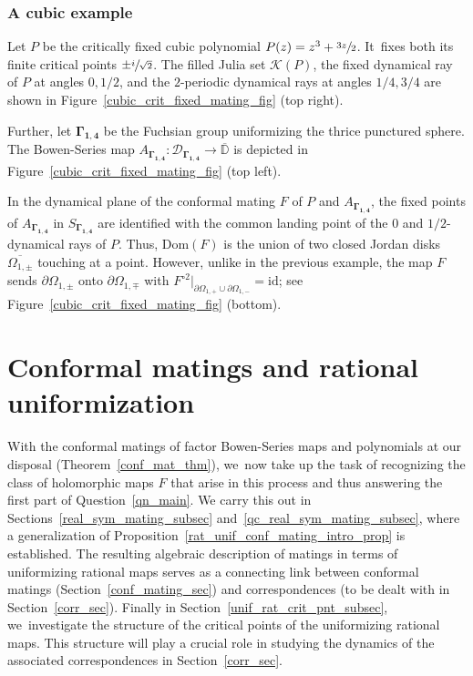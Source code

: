 \documentclass[JEP,XML,SOM,Unicode,NoFloatCountersInSection,published]{cedram}
\theoremstyle{definition}
\theoremstyle{remark}
\newcommand{\D}{\mathbb{D}}
\newcommand{\cK}{\mathcal{K}}
\begin{document}
\subsubsection{A cubic example}\label{cubic_example_subsubsec}

Let $P$ be the critically fixed cubic polynomial $P(z)=z^3+\sfrac{3z}{2}$. It~fixes both its finite critical points $\pm \sfrac{i}{\sqrt{2}}$. The filled Julia set $\cK(P)$, the fixed dynamical ray of $P$ at angles $0, 1/2$, and the $2$-periodic dynamical rays at angles $1/4, 3/4$ are shown in Figure~\ref{cubic_crit_fixed_mating_fig} (top right).

Further, let $\pmb{\Gamma_{1,4}}$ be the Fuchsian group uniformizing the thrice punctured sphere. The Bowen-Series map $A_{\pmb{\Gamma_{1,4}}}:\mathcal{D}_{\pmb{\Gamma_{1,4}}}\to\overline{\D}$ is depicted in Figure~\ref{cubic_crit_fixed_mating_fig} (top left).

In the dynamical plane of the conformal mating $F$ of $P$ and $A_{\pmb{\Gamma_{1,4}}}$, the fixed points of $A_{\pmb{\Gamma_{1,4}}}$ in $S_{\pmb{\Gamma_{1,4}}}$ are identified with the common landing point of the $0$ and $1/2$\nobreakdash-dynamical rays of $P$. Thus, $\mathrm{Dom}(F)$ is the union of two closed Jordan disks $\overline{\Omega_{1,\pm}}$ touching at a point. However, unlike in the previous example, the map $F$ sends $\partial\Omega_{1,\pm}$ onto $\partial\Omega_{1,\mp}$ with $F^{\circ 2}\vert_{\partial\Omega_{1,+}\cup\partial\Omega_{1,-}}=\mathrm{id}$; see Figure~\ref{cubic_crit_fixed_mating_fig} (bottom).

\section{Conformal matings and rational uniformization}\label{conf_mating_char_sec}

With the conformal matings of factor Bowen-Series maps and polynomials at our disposal (Theorem~\ref{conf_mat_thm}), we~now take up the task of recognizing the class of holomorphic maps
$F$ that arise in this process and thus answering the first part of Question~\ref{qn_main}.
We carry this out in Sections~\ref{real_sym_mating_subsec} and~\ref{qc_real_sym_mating_subsec}, where a generalization of Proposition~\ref{rat_unif_conf_mating_intro_prop} is established. The resulting algebraic description of matings in terms of uniformizing rational maps serves as a connecting link between conformal matings (Section~\ref{conf_mating_sec})
and correspondences (to be dealt with in Section~\ref{corr_sec}).
Finally in Section~\ref{unif_rat_crit_pnt_subsec}, we~investigate the structure of the critical points of the uniformizing rational maps. This structure will play a crucial role in studying the dynamics of the associated correspondences in Section~\ref{corr_sec}.
\end{document}
